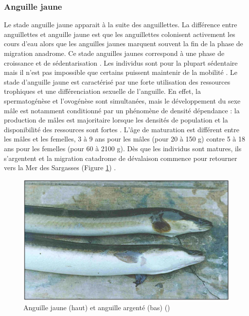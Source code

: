 \documentclass[11pt,titlepage,twoside]{article}\usepackage[]{graphicx}\usepackage[table]{xcolor}
\begin{document}
\subsubsection{Anguille jaune }

Le stade anguille jaune apparait à la suite des anguillettes. La différence entre anguillettes et anguille jaune est que les anguillettes colonisent activement les cours d’eau alors que les anguilles jaunes marquent souvent la fin de la phase de migration anadrome. Ce stade anguilles jaunes correspond à une phase de croissance et de sédentarisation \citep{laffaille_point_2005}. Les individus sont pour la plupart sédentaire mais il n’est pas impossible que certains puissent maintenir de la mobilité \citep{laffaille_point_2005}. Le stade d’anguille jaune est caractérisé par une forte utilisation des ressources trophiques et une différenciation sexuelle de l’anguille. En effet, la spermatogénèse et l’ovogénèse sont simultanées, mais le développement du sexe mâle est notamment conditionné par un phénomène de densité dépendance : la production de mâles est majoritaire lorsque les densités de population et la disponibilité des ressources sont fortes \citep{passakas_karyological_1980}. L’âge de maturation est différent entre les mâles et les femelles, 3 à 9 ans pour les mâles (pour 20 à 150 g) contre 5 à 18 ans pour les femelles (pour 60 à 2100 g). Dès que les individus sont matures, ils s’argentent et la migration catadrome de dévalaison commence pour retourner vers la Mer des Sargasses (Figure \ref{ang_jaune_argent}) \citep{feunteun_commercially_2011,oliveira_life_1999}.

\begin{figure}[htpb]
\centering
\includegraphics[width=\textwidth]{ang_jaune_argent}
\caption{Anguille jaune (haut) et anguille argenté (bas) (\citep{durif_migration_2003})}
\label{ang_jaune_argent}
\end{figure}
\end{document}
